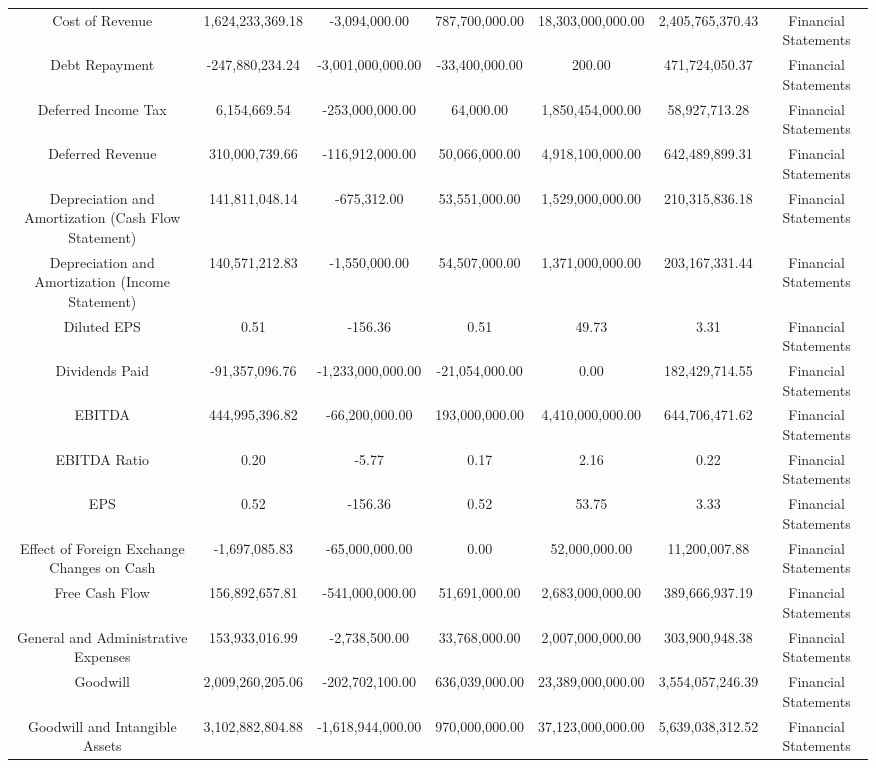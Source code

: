 \begin{longtable}{ccccccc}
Cost of Revenue & 1,624,233,369.18 & -3,094,000.00 & 787,700,000.00 & 18,303,000,000.00 & 2,405,765,370.43 & Financial Statements \\
Debt Repayment & -247,880,234.24 & -3,001,000,000.00 & -33,400,000.00 & 200.00 & 471,724,050.37 & Financial Statements \\
Deferred Income Tax & 6,154,669.54 & -253,000,000.00 & 64,000.00 & 1,850,454,000.00 & 58,927,713.28 & Financial Statements \\
Deferred Revenue & 310,000,739.66 & -116,912,000.00 & 50,066,000.00 & 4,918,100,000.00 & 642,489,899.31 & Financial Statements \\
Depreciation and Amortization (Cash Flow Statement) & 141,811,048.14 & -675,312.00 & 53,551,000.00 & 1,529,000,000.00 & 210,315,836.18 & Financial Statements \\
Depreciation and Amortization (Income Statement) & 140,571,212.83 & -1,550,000.00 & 54,507,000.00 & 1,371,000,000.00 & 203,167,331.44 & Financial Statements \\
Diluted EPS & 0.51 & -156.36 & 0.51 & 49.73 & 3.31 & Financial Statements \\
Dividends Paid & -91,357,096.76 & -1,233,000,000.00 & -21,054,000.00 & 0.00 & 182,429,714.55 & Financial Statements \\
EBITDA & 444,995,396.82 & -66,200,000.00 & 193,000,000.00 & 4,410,000,000.00 & 644,706,471.62 & Financial Statements \\
EBITDA Ratio & 0.20 & -5.77 & 0.17 & 2.16 & 0.22 & Financial Statements \\
EPS & 0.52 & -156.36 & 0.52 & 53.75 & 3.33 & Financial Statements \\
Effect of Foreign Exchange Changes on Cash & -1,697,085.83 & -65,000,000.00 & 0.00 & 52,000,000.00 & 11,200,007.88 & Financial Statements \\
Free Cash Flow & 156,892,657.81 & -541,000,000.00 & 51,691,000.00 & 2,683,000,000.00 & 389,666,937.19 & Financial Statements \\
General and Administrative Expenses & 153,933,016.99 & -2,738,500.00 & 33,768,000.00 & 2,007,000,000.00 & 303,900,948.38 & Financial Statements \\
Goodwill & 2,009,260,205.06 & -202,702,100.00 & 636,039,000.00 & 23,389,000,000.00 & 3,554,057,246.39 & Financial Statements \\
Goodwill and Intangible Assets & 3,102,882,804.88 & -1,618,944,000.00 & 970,000,000.00 & 37,123,000,000.00 & 5,639,038,312.52 & Financial Statements \\

\end{longtable}
